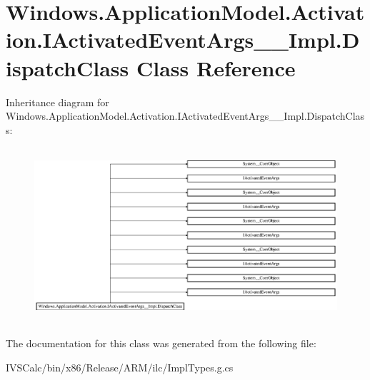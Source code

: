 \hypertarget{class_windows_1_1_application_model_1_1_activation_1_1_i_activated_event_args_____impl_1_1_dispatch_class}{}\section{Windows.\+Application\+Model.\+Activation.\+I\+Activated\+Event\+Args\+\_\+\+\_\+\+Impl.\+Dispatch\+Class Class Reference}
\label{class_windows_1_1_application_model_1_1_activation_1_1_i_activated_event_args_____impl_1_1_dispatch_class}
Inheritance diagram for Windows.\+Application\+Model.\+Activation.\+I\+Activated\+Event\+Args\+\_\+\+\_\+\+Impl.\+Dispatch\+Class\+:\begin{figure}[H]
\begin{center}
\leavevmode
\includegraphics[height=6.539279cm]{class_windows_1_1_application_model_1_1_activation_1_1_i_activated_event_args_____impl_1_1_dispatch_class}
\end{center}
\end{figure}


The documentation for this class was generated from the following file\+:\begin{DoxyCompactItemize}
\item 
I\+V\+S\+Calc/bin/x86/\+Release/\+A\+R\+M/ilc/Impl\+Types.\+g.\+cs\end{DoxyCompactItemize}
